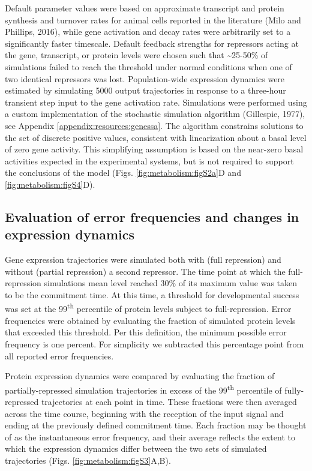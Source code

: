 Default parameter values were based on approximate transcript and protein synthesis and turnover rates for animal cells reported in the literature (Milo and Phillips, 2016), while gene activation and decay rates were arbitrarily set to a significantly faster timescale. Default feedback strengths for repressors acting at the gene, transcript, or protein levels were chosen such that \sim 25-50\% of simulations failed to reach the threshold under normal conditions when one of two identical repressors was lost. Population-wide expression dynamics were estimated by simulating 5000 output trajectories in response to a three-hour transient step input to the gene activation rate. Simulations were performed using a custom implementation of the stochastic simulation algorithm (Gillespie, 1977), see Appendix \ref{appendix:resources:genessa}. The algorithm constrains solutions to the set of discrete positive values, consistent with linearization about a basal level of zero gene activity. This simplifying assumption is based on the near-zero basal activities expected in the experimental systems, but is not required to support the conclusions of the model (Figs. \ref{fig:metabolism:figS2a}D and \ref{fig:metabolism:figS4}D).

\subsection{Evaluation of error frequencies and changes in expression dynamics}
\label{appendix:methods:metabolism:scoring}

Gene expression trajectories were simulated both with (full repression) and without (partial repression) a second repressor. The time point at which the full-repression simulations mean level reached 30\% of its maximum value was taken to be the commitment time. At this time, a threshold for developmental success was set at the 99\textsuperscript{th} percentile of protein levels subject to full-repression. Error frequencies were obtained by evaluating the fraction of simulated protein levels that exceeded this threshold. Per this definition, the minimum possible error frequency is one percent. For simplicity we subtracted this percentage point from all reported error frequencies.

Protein expression dynamics were compared by evaluating the fraction of partially-repressed simulation trajectories in excess of the 99\textsuperscript{th} percentile of fully-repressed trajectories at each point in time. These fractions were then averaged across the time course, beginning with the reception of the input signal and ending at the previously defined commitment time. Each fraction may be thought of as the instantaneous error frequency, and their average reflects the extent to which the expression dynamics differ between the two sets of simulated trajectories (Figs. \ref{fig:metabolism:figS3}A,B).

